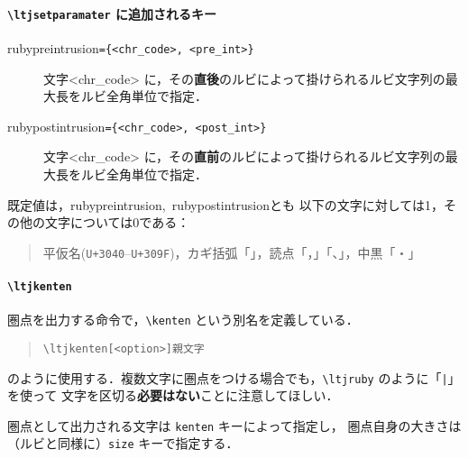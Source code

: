 \documentclass[a4paper,10pt]{ltjsarticle}
\begin{document}
\paragraph{\texttt{\textbackslash ltjsetparamater} に追加されるキー}
\begin{description}
\item[\textsf{rubypreintrusion}\tt =\{<chr\_code>, <pre\_int>\}]
文字<chr\_code> に，その\textbf{直後}のルビによって掛けられるルビ文字列の最大長をルビ全角単位で指定．
\item[\textsf{rubypostintrusion}\tt =\{<chr\_code>, <post\_int>\}]
文字<chr\_code> に，その\textbf{直前}のルビによって掛けられるルビ文字列の最大長をルビ全角単位で指定．
\end{description}
既定値は，\textsf{rubypreintrusion},~\textsf{rubypostintrusion}とも
以下の文字に対しては1，その他の文字については0である：
\begin{quote}
 平仮名(\texttt{U+3040}--\texttt{U+309F})，カギ括弧「」，読点「，」「、」，中黒「・」
\end{quote}

\paragraph{\texttt{\textbackslash ltjkenten}}
圏点を出力する命令で，\verb+\kenten+ という別名を定義している．
\begin{quote}
 \tt \textbackslash ltjkenten[<option>]{親文字}
\end{quote}
のように使用する．複数文字に圏点をつける場合でも，\verb+\ltjruby+ のように「\texttt{|}」を使って
文字を区切る\textbf{必要はない}ことに注意してほしい．

圏点として出力される文字は \texttt{kenten} キーによって指定し，
圏点自身の大きさは（ルビと同様に）\texttt{size} キーで指定する．

\newpage
\end{document}

